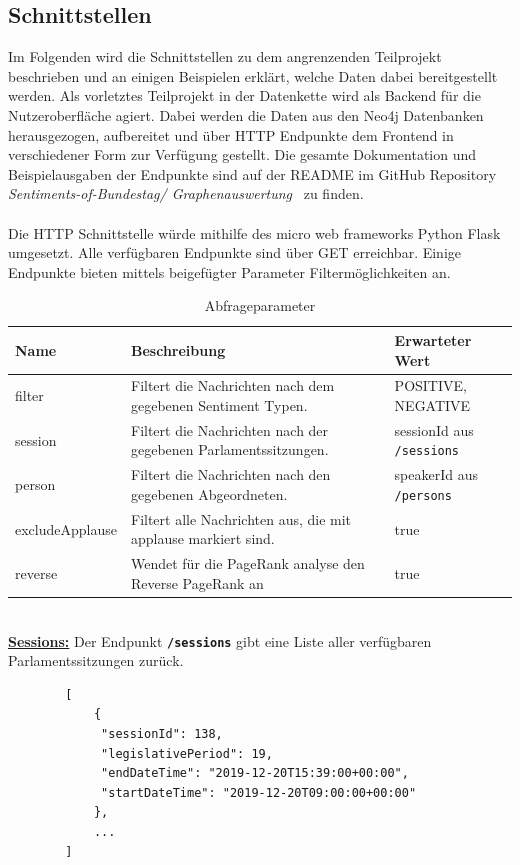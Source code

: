 \subsection{Schnittstellen}
Im Folgenden wird die Schnittstellen zu dem angrenzenden Teilprojekt beschrieben und an einigen Beispielen erklärt, welche Daten dabei bereitgestellt werden. Als vorletztes Teilprojekt in der Datenkette wird als Backend für die Nutzeroberfläche agiert. Dabei werden die Daten aus den Neo4j Datenbanken herausgezogen, aufbereitet und über HTTP Endpunkte dem Frontend in verschiedener Form zur Verfügung gestellt. Die gesamte Dokumentation und Beispielausgaben der Endpunkte sind auf der README im GitHub Repository \textit{Sentiments-of-Bundestag/ Graphenauswertung}~\cite{github_endpoints} zu finden.
\\~\\
Die HTTP Schnittstelle würde mithilfe des micro web frameworks Python Flask \cite{flask} umgesetzt. Alle verfügbaren Endpunkte sind über GET erreichbar. Einige Endpunkte bieten mittels beigefügter Parameter Filtermöglichkeiten an. 
\begin{table}[ht]
	\caption{Abfrageparameter}
	\label{tab:filter}
	\begin{tabular}{|p{3 cm}|p{8.5 cm}|p{2.5 cm}|}
		\hline
		\textbf{Name} & \textbf{Beschreibung} & \textbf{Erwarteter Wert} \\
		\hline
		filter & Filtert die Nachrichten nach dem gegebenen Sentiment Typen. & POSITIVE, NEGATIVE \\
		\hline
		session & Filtert die Nachrichten nach der gegebenen Parlamentssitzungen. & sessionId aus \texttt{/sessions} \\
		\hline
		person & Filtert die Nachrichten nach den gegebenen Abgeordneten. & speakerId aus \texttt{/persons} \\
		\hline
		excludeApplause & Filtert alle Nachrichten aus, die mit applause markiert sind. & true \\
		\hline
		reverse & Wendet für die PageRank analyse den Reverse PageRank an & true \\
		\hline
	\end{tabular}
\end{table} 
~\\
\textbf{\underline{Sessions:}}\newline
Der Endpunkt \textbf{\texttt{/sessions}} gibt eine Liste aller verfügbaren Parlamentssitzungen zurück.
\begin{lstlisting}
		[
			{
			 "sessionId": 138, 
			 "legislativePeriod": 19, 
			 "endDateTime": "2019-12-20T15:39:00+00:00", 
			 "startDateTime": "2019-12-20T09:00:00+00:00"
			},
			...
		]
\end{lstlisting}	
